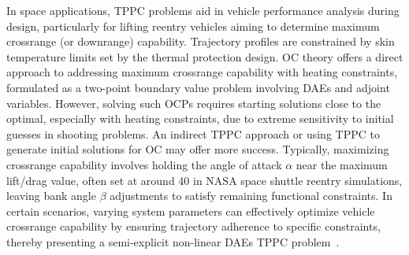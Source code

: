 In space applications, \ac{TPPC} problems aid in vehicle performance analysis during design, particularly for lifting reentry vehicles aiming to determine maximum crossrange (or downrange) capability. Trajectory profiles are constrained by skin temperature limits set by the thermal protection design. \ac{OC} theory offers a direct approach to addressing maximum crossrange capability with heating constraints, formulated as a two-point boundary value problem involving \acp{DAE} and adjoint variables. However, solving such \acp{OCP} requires starting solutions close to the optimal, especially with heating constraints, due to extreme sensitivity to initial guesses in shooting problems. An indirect \ac{TPPC} approach or using \ac{TPPC} to generate initial solutions for \ac{OC} may offer more success. Typically, maximizing crossrange capability involves holding the angle of attack $\alpha$ near the maximum lift/drag value, often set at around \SI{40}{\deg} in \ac{NASA} space shuttle reentry simulations, leaving bank angle $\beta$ adjustments to satisfy remaining functional constraints. In certain scenarios, varying system parameters can effectively optimize vehicle crossrange capability by ensuring trajectory adherence to specific constraints, thereby presenting a semi-explicit non-linear \acp{DAE} \ac{TPPC} problem~\cite{brenan1986numerical, brenan1995numerical}.

